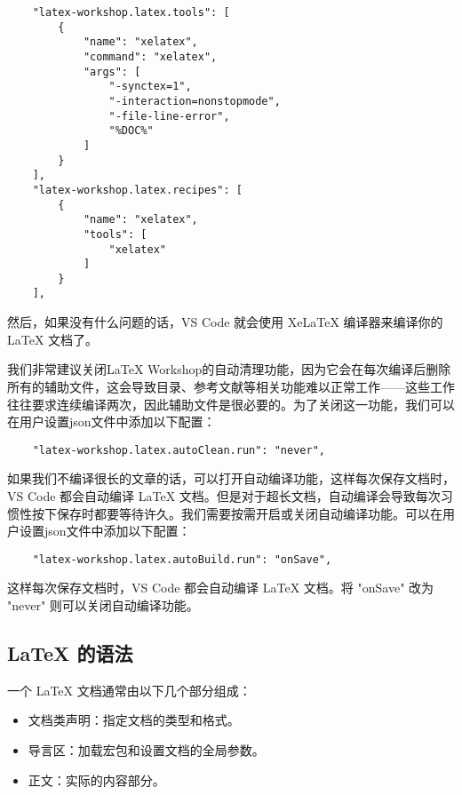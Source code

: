 \documentclass[../main.tex]{subfiles}
\begin{document}
\begin{verbatim}
    "latex-workshop.latex.tools": [
        {
            "name": "xelatex",
            "command": "xelatex",
            "args": [
                "-synctex=1",
                "-interaction=nonstopmode",
                "-file-line-error",
                "%DOC%"
            ]
        }
    ],
    "latex-workshop.latex.recipes": [
        {
            "name": "xelatex",
            "tools": [
                "xelatex"
            ]
        }
    ],
\end{verbatim}

然后，如果没有什么问题的话，VS Code 就会使用 XeLaTeX 编译器来编译你的 LaTeX 文档了。

我们非常建议关闭LaTeX Workshop的自动清理功能，因为它会在每次编译后删除所有的辅助文件，这会导致目录、参考文献等相关功能难以正常工作——这些工作往往要求连续编译两次，因此辅助文件是很必要的。为了关闭这一功能，我们可以在用户设置json文件中添加以下配置：
\begin{verbatim}
    "latex-workshop.latex.autoClean.run": "never",
\end{verbatim}

如果我们不编译很长的文章的话，可以打开自动编译功能，这样每次保存文档时，VS Code 都会自动编译 LaTeX 文档。但是对于超长文档，自动编译会导致每次习惯性按下保存时都要等待许久。我们需要按需开启或关闭自动编译功能。可以在用户设置json文件中添加以下配置：
\begin{verbatim}
    "latex-workshop.latex.autoBuild.run": "onSave",
\end{verbatim}
这样每次保存文档时，VS Code 都会自动编译 LaTeX 文档。将 "onSave" 改为 "never" 则可以关闭自动编译功能。

\subsection{LaTeX 的语法}

一个 LaTeX 文档通常由以下几个部分组成：
\begin{itemize}
  \item 文档类声明：指定文档的类型和格式。
  \item 导言区：加载宏包和设置文档的全局参数。
  \item 正文：实际的内容部分。
\end{itemize}
\end{document}
